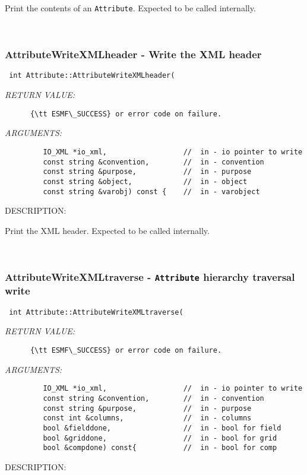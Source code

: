       Print the contents of an {\tt Attribute}.  Expected to be
      called internally.
   
 
\mbox{}\hrulefill\
 
\subsubsection [AttributeWriteXMLheader] {AttributeWriteXMLheader - Write the XML header}


  
\begin{verbatim} int Attribute::AttributeWriteXMLheader(\end{verbatim}{\em RETURN VALUE:}
\begin{verbatim}      {\tt ESMF\_SUCCESS} or error code on failure.\end{verbatim}{\em ARGUMENTS:}
\begin{verbatim}         IO_XML *io_xml,                  //  in - io pointer to write
         const string &convention,        //  in - convention
         const string &purpose,           //  in - purpose
         const string &object,            //  in - object
         const string &varobj) const {    //  in - varobject\end{verbatim}
{\sf DESCRIPTION:\\ }


      Print the XML header.  Expected to be
      called internally.
   
 
\mbox{}\hrulefill\
 
\subsubsection [AttributeWriteXMLtraverse] {AttributeWriteXMLtraverse - {\tt Attribute} hierarchy traversal write}


  
\begin{verbatim} int Attribute::AttributeWriteXMLtraverse(\end{verbatim}{\em RETURN VALUE:}
\begin{verbatim}      {\tt ESMF\_SUCCESS} or error code on failure.\end{verbatim}{\em ARGUMENTS:}
\begin{verbatim}         IO_XML *io_xml,                  //  in - io pointer to write
         const string &convention,        //  in - convention
         const string &purpose,           //  in - purpose
         const int &columns,              //  in - columns
         bool &fielddone,                 //  in - bool for field
         bool &griddone,                  //  in - bool for grid
         bool &compdone) const{           //  in - bool for comp\end{verbatim}
{\sf DESCRIPTION:\\ }


